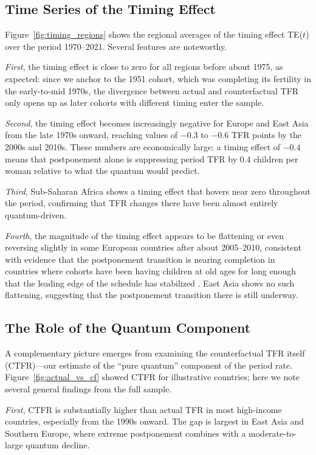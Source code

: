 \documentclass[12pt]{article}
\begin{document}
\subsection{Time Series of the Timing Effect}

Figure~\ref{fig:timing_regions} shows the regional averages of the
timing effect TE($t$) over the period 1970--2021.  Several features
are noteworthy.

\emph{First}, the timing effect is close to zero for all regions
before about 1975, as expected: since we anchor to the 1951 cohort,
which was completing its fertility in the early-to-mid 1970s, the
divergence between actual and counterfactual TFR only opens up as
later cohorts with different timing enter the sample.

\emph{Second}, the timing effect becomes increasingly negative for
Europe and East Asia from the late 1970s onward, reaching values of
$-0.3$ to $-0.6$ TFR points by the 2000s and 2010s.  These numbers
are economically large: a timing effect of $-0.4$ means that
postponement alone is suppressing period TFR by 0.4 children per
woman relative to what the quantum would predict.

\emph{Third}, Sub-Saharan Africa shows a timing effect that hovers
near zero throughout the period, confirming that TFR changes there
have been almost entirely quantum-driven.

\emph{Fourth}, the magnitude of the timing effect appears to be
flattening or even reversing slightly in some European countries after
about 2005--2010, consistent with evidence that the postponement
transition is nearing completion in countries where cohorts have been
having children at old ages for long enough that the leading edge of
the schedule has stabilized \citep{Sobotka2017}.  East Asia shows no
such flattening, suggesting that the postponement transition there is
still underway.

\subsection{The Role of the Quantum Component}

A complementary picture emerges from examining the counterfactual TFR
itself (CTFR)---our estimate of the ``pure quantum'' component of the
period rate.  Figure~\ref{fig:actual_vs_cf} showed CTFR for illustrative
countries; here we note several general findings from the full sample.

\emph{First}, CTFR is substantially higher than actual TFR in most
high-income countries, especially from the 1990s onward.  The gap is
largest in East Asia and Southern Europe, where extreme postponement
combines with a moderate-to-large quantum decline.
\end{document}

